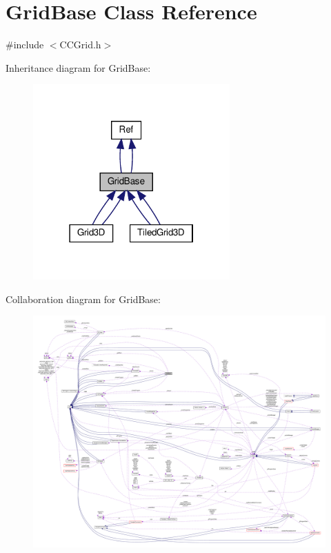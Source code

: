 \hypertarget{classGridBase}{}\section{Grid\+Base Class Reference}
\label{classGridBase}


{\ttfamily \#include $<$C\+C\+Grid.\+h$>$}



Inheritance diagram for Grid\+Base\+:
\nopagebreak
\begin{figure}[H]
\begin{center}
\leavevmode
\includegraphics[width=214pt]{classGridBase__inherit__graph}
\end{center}
\end{figure}


Collaboration diagram for Grid\+Base\+:
\nopagebreak
\begin{figure}[H]
\begin{center}
\leavevmode
\includegraphics[width=350pt]{classGridBase__coll__graph}
\end{center}
\end{figure}
